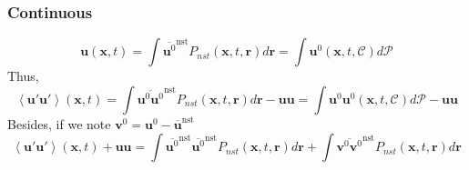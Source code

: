 \documentclass[12pt]{My_preprint}
\newcommand{\avg}[1]{\left<#1\right>}
\renewcommand{\avg}[1]{\left<#1\right>}
\newcommand{\nstavg}[1]{\overline{#1}^\text{nst}}
\newcommand{\CC}{\mathscr{C}}
\newcommand{\PP}{\mathscr{P}}
\begin{document}
\subsubsection*{Continuous}
\begin{equation*}
    \textbf{u}(\textbf{x},t)
    = \int \nstavg{ \textbf{u}^0}  P_{nst}(\textbf{x},t,\textbf{r}) d\textbf{r}
    = \int  \textbf{u}^0(\textbf{x},t,\CC) d\PP 
\end{equation*}
Thus, 
\begin{equation*}
    \avg{\textbf{u}'\textbf{u}'}(\textbf{x},t)
    = \int \nstavg{ \textbf{u}^0 \textbf{u}^0}  
    P_{nst}(\textbf{x},t,\textbf{r}) d\textbf{r}
    - \textbf{uu}
    = \int  \textbf{u}^0\textbf{u}^0(\textbf{x},t,\CC) d\PP 
    - \textbf{uu}
\end{equation*}
Besides, if we note $\textbf{v}^0  =  \textbf{u}^0  - \nstavg{\textbf{u}}$
\begin{equation*}
    \avg{\textbf{u}'\textbf{u}'}(\textbf{x},t)
    + \textbf{uu}
    = \int 
    \nstavg{\textbf{u}^0} \nstavg{\textbf{u}^0} 
    P_{nst}(\textbf{x},t,\textbf{r}) d\textbf{r}
    +\int 
    \nstavg{ \textbf{v}^0\textbf{v}^0}  
    P_{nst}(\textbf{x},t,\textbf{r}) d\textbf{r}
\end{equation*}
\end{document}
